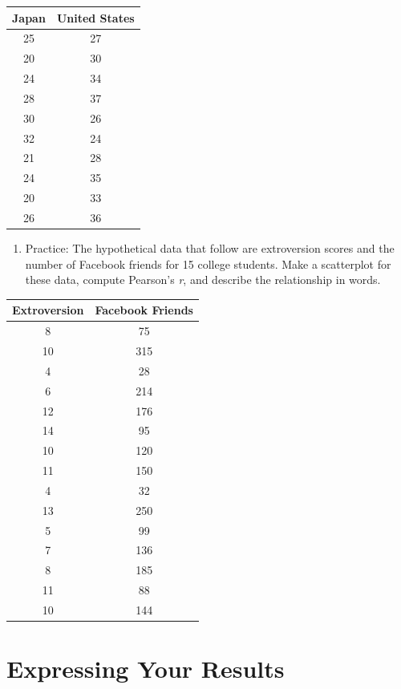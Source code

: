 \documentclass[
]{krantz}
\providecommand{\tightlist}{%
  \setlength{\itemsep}{0pt}\setlength{\parskip}{0pt}}
\begin{document}
\begin{longtable}[]{@{}cc@{}}
\toprule()
Japan & United States \\
\midrule()
\endhead
25 & 27 \\
20 & 30 \\
24 & 34 \\
28 & 37 \\
30 & 26 \\
32 & 24 \\
21 & 28 \\
24 & 35 \\
20 & 33 \\
26 & 36 \\
\bottomrule()
\end{longtable}

\begin{enumerate}
\def\labelenumi{\arabic{enumi}.}
\setcounter{enumi}{1}
\tightlist
\item
  Practice: The hypothetical data that follow are extroversion scores and the number of Facebook friends for 15 college students. Make a scatterplot for these data, compute Pearson's \emph{r}, and describe the relationship in words.
\end{enumerate}

\begin{longtable}[]{@{}cc@{}}
\toprule()
Extroversion & Facebook Friends \\
\midrule()
\endhead
8 & 75 \\
10 & 315 \\
4 & 28 \\
6 & 214 \\
12 & 176 \\
14 & 95 \\
10 & 120 \\
11 & 150 \\
4 & 32 \\
13 & 250 \\
5 & 99 \\
7 & 136 \\
8 & 185 \\
11 & 88 \\
10 & 144 \\
\bottomrule()
\end{longtable}

\hypertarget{expressing-your-results}{%
\section{Expressing Your Results}\label{expressing-your-results}}
\end{document}
